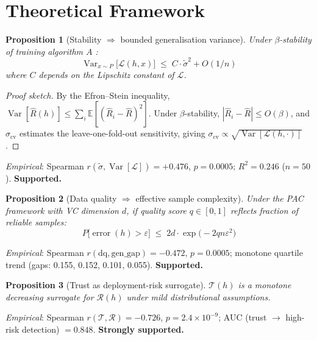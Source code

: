 \documentclass[10pt]{article}
\newtheorem{proposition}{Proposition}
\newcommand{\trust}{\mathcal{T}}
\newcommand{\risk}{\mathcal{R}}
\newcommand{\E}{\mathbb{E}}
\begin{document}
\section{Theoretical Framework}
\label{sec:theory}

\begin{proposition}[Stability $\Rightarrow$ bounded generalisation variance]
\label{prop:stability}
Under $\beta$-stability of training algorithm $A$ \citep{bousquet2002stability}:
\[
\operatorname{Var}_{x\sim P}\!\bigl[\mathcal{L}(h,x)\bigr] \;\leq\; C\cdot\tilde\sigma^2 + O(1/n)
\]
where $C$ depends on the Lipschitz constant of $\mathcal{L}$.
\end{proposition}

\begin{proof}[Proof sketch]
By the Efron--Stein inequality, $\operatorname{Var}[\hat R(h)] \le \sum_i \E[(\hat R_i - \hat R)^2]$. Under $\beta$-stability, $|\hat R_i - \hat R|\le O(\beta)$, and $\sigma_\text{cv}$ estimates the leave-one-fold-out sensitivity, giving $\sigma_\text{cv} \propto \sqrt{\operatorname{Var}[\mathcal{L}(h,\cdot)]}$.
\end{proof}

\emph{Empirical}: Spearman $r(\tilde\sigma, \operatorname{Var}[\mathcal{L}]) = +0.476$, $p=0.0005$; $R^2 = 0.246$ ($n=50$). \textbf{Supported.}

\begin{proposition}[Data quality $\Rightarrow$ effective sample complexity]
\label{prop:dq}
Under the PAC framework with VC dimension $d$, if quality score $q\in[0,1]$ reflects fraction of reliable samples:
\[
P\!\bigl[\operatorname{error}(h) > \varepsilon\bigr] \;\leq\; 2d\cdot\exp\!\bigl(-2qn\varepsilon^2\bigr)
\]
\end{proposition}

\emph{Empirical}: Spearman $r(\text{dq}, \text{gen\_gap}) = -0.472$, $p=0.0005$; monotone quartile trend (gaps: 0.155, 0.152, 0.101, 0.055). \textbf{Supported.}

\begin{proposition}[Trust as deployment-risk surrogate]
\label{prop:trust}
$\trust(h)$ is a monotone decreasing surrogate for $\risk(h)$ under mild distributional assumptions.
\end{proposition}

\emph{Empirical}: Spearman $r(\trust, \risk) = -0.726$, $p=2.4\times10^{-9}$; AUC (trust $\to$ high-risk detection) $= 0.848$. \textbf{Strongly supported.}
\end{document}
